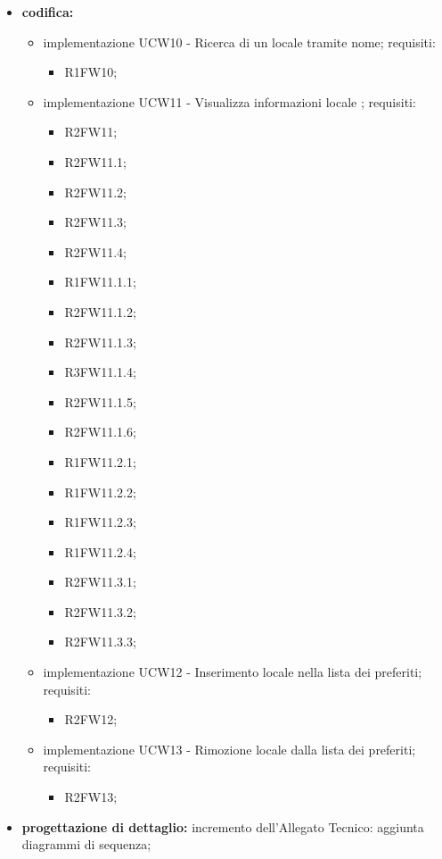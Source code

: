 \begin{itemize}
	\item \textbf{codifica:} 
			\begin{itemize}
				\item implementazione UCW10 - Ricerca di un locale tramite nome; requisiti:
					\begin{itemize}
						\item R1FW10;
					\end{itemize}
				\item implementazione UCW11 - Visualizza informazioni locale ; requisiti:
					\begin{itemize}
						\item R2FW11;
						\item R2FW11.1;
						\item R2FW11.2;
						\item R2FW11.3;
						\item R2FW11.4;
      					\item R1FW11.1.1;
           				\item R2FW11.1.2;
               			\item R2FW11.1.3;
                  		\item R3FW11.1.4;
                   		\item R2FW11.1.5;
						\item R2FW11.1.6;
						\item R1FW11.2.1;
						\item R1FW11.2.2;
						\item R1FW11.2.3;
						\item R1FW11.2.4;
						\item R2FW11.3.1;
						\item R2FW11.3.2;
						\item R2FW11.3.3;
					\end{itemize}
				\item implementazione UCW12 - Inserimento locale nella lista dei preferiti; requisiti:
					\begin{itemize}
						\item R2FW12;
					\end{itemize}
				\item implementazione UCW13 - Rimozione locale dalla lista dei preferiti; requisiti:
					\begin{itemize}
						\item R2FW13;
					\end{itemize}
			\end{itemize}
	\item \textbf{progettazione di dettaglio:} incremento dell’Allegato Tecnico: aggiunta diagrammi di sequenza;

\end{itemize}
